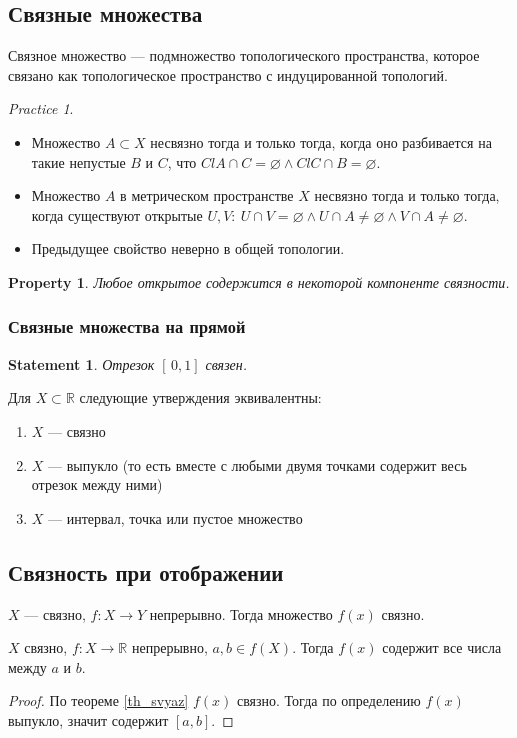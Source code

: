 \documentclass[11pt]{book}
\newcommand{\R}{\mathbb{R}}
\theoremstyle{definition}
\theoremstyle{plain}
\theoremstyle{plain}
\newtheorem*{st}{Statement}
\newtheorem*{prop}{Property}
\theoremstyle{definition}
\theoremstyle{remark}
\newtheorem*{prac}{Practice}
\begin{document}
\subsection{Связные множества}
\begin{defn}
    Связное множество --- подмножество топологического пространства, которое связано как топологическое пространство с индуцированной топологий.
\end{defn}
\begin{prac}
    $ $
    \begin{itemize}
	\item  Множество $ A \subset X$ несвязно тогда и только тогда, когда  оно разбивается на такие непустые $ B$ и  $ C$, что  $ Cl A \cap C = \varnothing \wedge Cl C \cap B = \varnothing$.
	\item Множество $ A$ в метрическом пространстве  $ X$ несвязно  тогда и только тогда, когда существуют открытые $ U, V: ~ U \cap V = \varnothing \wedge U \cap A \ne \varnothing \wedge V \cap A \ne  \varnothing$.
	\item Предыдущее свойство неверно в общей топологии.
    \end{itemize}
\end{prac}
\begin{prop}
    Любое открытое содержится в некоторой компоненте связности.
\end{prop}
\subsubsection{Связные множества на прямой}
\begin{st}
    Отрезок $ [\,0, 1]$ связен.
\end{st}
\begin{thm}
    Для $ X \subset \R$ следующие утверждения эквивалентны:
    $ $
    \begin{enumerate}
	\item  $ X$ --- связно
	\item  $ X$ --- выпукло (то есть вместе с любыми двумя точками содержит весь отрезок между ними)
	\item $ X$ --- интервал, точка или пустое множество
    \end{enumerate}
\end{thm}
\subsection{Связность при отображении}
\begin{thm}\label{th_svyaz}
    $ X$ --- связно, $ f: X \to  Y$ непрерывно. Тогда множество $ f(x)$ связно.
\end{thm}
\begin{thm}
    $ X$ связно,  $ f: X \to  \R$ непрерывно, $ a, b \in  f(X)$.
    Тогда $ f(x)$ содержит все числа между  $ a$ и  $ b$.
\end{thm}
\begin{proof}
    По теореме \ref{th_svyaz} $ f(x) $ связно. Тогда по определению $ f(x) $ выпукло, значит содержит  $ [a, b]$.
\end{proof}
\end{document}
